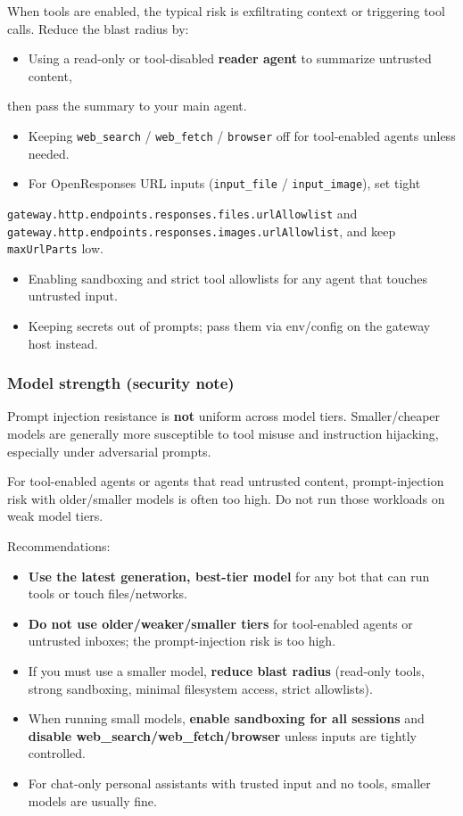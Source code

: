 When tools are enabled, the typical risk is exfiltrating context or triggering
tool calls. Reduce the blast radius by:

\begin{itemize}
  \item Using a read-only or tool-disabled \textbf{reader agent} to summarize untrusted content,
\end{itemize}

then pass the summary to your main agent.
\begin{itemize}
  \item Keeping \texttt{web\_search} / \texttt{web\_fetch} / \texttt{browser} off for tool-enabled agents unless needed.
  \item For OpenResponses URL inputs (\texttt{input\_file} / \texttt{input\_image}), set tight
\end{itemize}

\texttt{gateway.http.endpoints.responses.files.urlAllowlist} and
\texttt{gateway.http.endpoints.responses.images.urlAllowlist}, and keep \texttt{maxUrlParts} low.
\begin{itemize}
  \item Enabling sandboxing and strict tool allowlists for any agent that touches untrusted input.
  \item Keeping secrets out of prompts; pass them via env/config on the gateway host instead.
\end{itemize}


\subsubsection{Model strength (security note)}


Prompt injection resistance is \textbf{not} uniform across model tiers. Smaller/cheaper models are generally more susceptible to tool misuse and instruction hijacking, especially under adversarial prompts.

For tool-enabled agents or agents that read untrusted content, prompt-injection risk with older/smaller models is often too high. Do not run those workloads on weak model tiers.

Recommendations:

\begin{itemize}
  \item \textbf{Use the latest generation, best-tier model} for any bot that can run tools or touch files/networks.
  \item \textbf{Do not use older/weaker/smaller tiers} for tool-enabled agents or untrusted inboxes; the prompt-injection risk is too high.
  \item If you must use a smaller model, \textbf{reduce blast radius} (read-only tools, strong sandboxing, minimal filesystem access, strict allowlists).
  \item When running small models, \textbf{enable sandboxing for all sessions} and \textbf{disable web\_search/web\_fetch/browser} unless inputs are tightly controlled.
  \item For chat-only personal assistants with trusted input and no tools, smaller models are usually fine.
\end{itemize}


